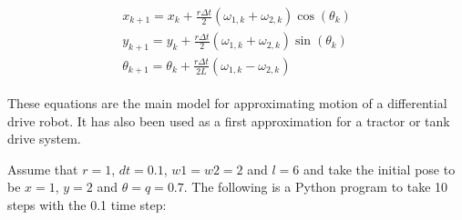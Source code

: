 \[\begin{aligned}
\begin{array}{l}
 x_{k+1} = x_k + \frac{r\Delta t}{2} (\omega_{1, k}+\omega_{2, k})\cos(\theta_k) \\[5mm]
y_{k+1} = y_k + \frac{r\Delta t}{2} (\omega_{1, k}+\omega_{2, k})\sin(\theta_k) \\[5mm]
\theta_{k+1} = \theta_k + \frac{r\Delta t}{2L} (\omega_{1, k}-\omega_{2, k})
\end{array}
\end{aligned}\]

These equations are the main model for approximating motion of a
differential drive robot. It has also been used as a first approximation
for a tractor or tank drive system.

\hypertarget{listDDstep}{%
\label{listDDstep}}%
\begin{Shaded}
\begin{Highlighting}[]
\OperatorTok{,}\OperatorTok{,}\OperatorTok{,}\OperatorTok{,}\OperatorTok{,}\OperatorTok{,}\OperatorTok{,}
\OperatorTok{=}\OperatorTok{+}\OperatorTok{*}\OperatorTok{/}\NormalTok{)}\OperatorTok{*}\OperatorTok{+}\OperatorTok{*}
\OperatorTok{=}\OperatorTok{+}\OperatorTok{*}\OperatorTok{/}\NormalTok{)}\OperatorTok{*}\OperatorTok{+}\OperatorTok{*}
\OperatorTok{=}\OperatorTok{+}\OperatorTok{*}\OperatorTok{/}\NormalTok{(}\OperatorTok{*}\OperatorTok{*}\OperatorTok{{-}}
   \OperatorTok{,}\OperatorTok{,}
\end{Highlighting}
\end{Shaded}

Assume that \(r=1\), \(dt = 0.1\), \(w1=w2=2\) and \(l=6\) and take the
initial pose to be \(x=1\), \(y=2\) and \(\theta = q =0.7\). The
following is a Python program to take 10 steps with the 0.1 time step:

